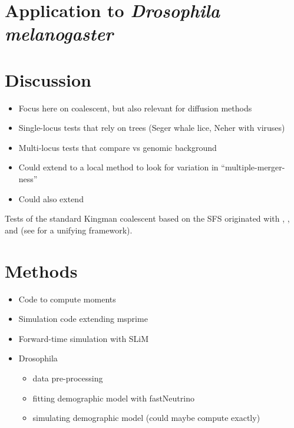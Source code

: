 \documentclass[11pt, letterpaper]{article}   	%
\begin{document}
\section*{Application to \textit{Drosophila melanogaster}}

\section*{Discussion}
\begin{itemize}
    \item Focus here on coalescent, but also relevant for diffusion methods
    \item Single-locus tests that rely on trees (Seger whale lice, Neher with viruses)
    \item Multi-locus tests that compare vs genomic background
    \item Could extend to a local method to look for variation in ``multiple-merger-ness''
    \item Could also extend
\end{itemize}

Tests of the standard Kingman coalescent based on the SFS originated with \cite{Tajima1989}, \cite{FuLi1993}, and \cite{SimonsenEtAl1995} (see \cite{Achaz2009} for a unifying framework).

\section*{Methods}
\begin{itemize}
    \item Code to compute moments
    \item Simulation code extending msprime
    \item Forward-time simulation with SLiM
    \item Drosophila
    \begin{itemize}
        \item data pre-processing
        \item fitting demographic model with fastNeutrino
        \item simulating demographic model (could maybe compute exactly)
    \end{itemize}
\end{itemize}

\printbibliography
\end{document}
